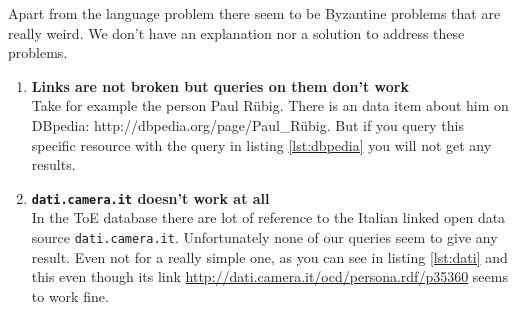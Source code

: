 Apart from the language problem there seem to be Byzantine problems that are really weird. We don't have an explanation nor a solution to address these problems.

\begin{enumerate}
\item \textbf{Links are not broken but queries on them don't work}\\
Take for example the person Paul R\"ubig. There is an data item about him on DBpedia: http://dbpedia.org/page/Paul\_R\"ubig. But if you query this specific resource with the query in listing \ref{lst:dbpedia} you will not get any results.


\item \textbf{\texttt{dati.camera.it} doesn't work at all}\\
In the ToE database there are lot of reference to the Italian linked open data source \texttt{dati.camera.it}. Unfortunately none of our queries seem to give any result. Even not for a really simple one, as you can see in listing \ref{lst:dati} and this even though its link \url{http://dati.camera.it/ocd/persona.rdf/p35360} seems to work fine.


\end{enumerate}

